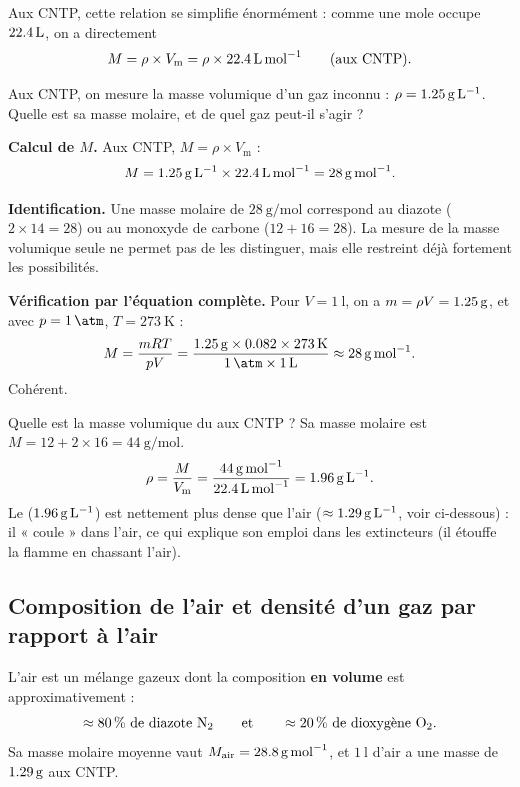 \documentclass[11pt,a4paper]{article}
\newcommand{\Vm}{V_{\mathrm{m}}}
\begin{document}
\noindent Aux CNTP, cette relation se simplifie énormément : comme une mole occupe
$\qty{22{,}4}{\litre}$, on a directement
\[ M = \rho\times\Vm = \rho\times\qty{22{,}4}{\litre\per\mole}\qquad(\text{aux CNTP}). \]

\begin{exemple}
Aux CNTP, on mesure la masse volumique d'un gaz inconnu : $\rho=\qty{1{,}25}{\gram\per\litre}$. Quelle
est sa masse molaire, et de quel gaz peut-il s'agir ?

\smallskip
\textbf{Calcul de $M$.} Aux CNTP, $M=\rho\times\Vm$ :
\[ M=\qty{1{,}25}{\gram\per\litre}\times\qty{22{,}4}{\litre\per\mole}=\qty{28}{\gram\per\mole}. \]

\textbf{Identification.} Une masse molaire de $\qty{28}{\gram\per\mole}$ correspond au diazote 
($2\times14=28$) ou au monoxyde de carbone  ($12+16=28$). La mesure de la masse volumique seule
ne permet pas de les distinguer, mais elle restreint déjà fortement les possibilités.

\textbf{Vérification par l'équation complète.} Pour $V=\qty{1}{\litre}$, on a
$m=\rho V=\qty{1{,}25}{\gram}$, et avec $p=\qty{1}{\atm}$, $T=\qty{273}{\kelvin}$ :
\[ M=\frac{mRT}{pV}
    =\frac{\qty{1{,}25}{\gram}\times\num{0,082}\times\qty{273}{\kelvin}}{\qty{1}{\atm}\times\qty{1}{\litre}}
    \approx\qty{28}{\gram\per\mole}. \]
Cohérent.
\end{exemple}

\begin{exemple}
Quelle est la masse volumique du  aux CNTP ? Sa masse molaire est
$M=12+2\times16=\qty{44}{\gram\per\mole}$.
\[ \rho=\frac{M}{\Vm}=\frac{\qty{44}{\gram\per\mole}}{\qty{22{,}4}{\litre\per\mole}}
       =\qty{1{,}96}{\gram\per\litre}. \]
Le  ($\qty{1{,}96}{\gram\per\litre}$) est nettement plus dense que l'air
($\approx\qty{1{,}29}{\gram\per\litre}$, voir ci-dessous) : il « coule » dans l'air, ce qui explique
son emploi dans les extincteurs (il étouffe la flamme en chassant l'air).
\end{exemple}

\subsection{Composition de l'air et densité d'un gaz par rapport à l'air}

\begin{definition}
L'air est un mélange gazeux dont la composition \textbf{en volume} est approximativement :
\[ \approx 80\,\%\ \text{de diazote } \ce{N2} \qquad\text{et}\qquad \approx 20\,\%\ \text{de
dioxygène } \ce{O2}. \]
Sa masse molaire moyenne vaut $M_{\text{air}}=\qty{28{,}8}{\gram\per\mole}$, et $\qty{1}{\litre}$ d'air
a une masse de $\qty{1{,}29}{\gram}$ aux CNTP.
\end{definition}
\end{document}
